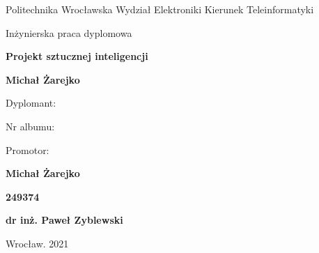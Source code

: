 \documentclass[12pt,oneside,a4paper]{report}
\begin{document}
\begin{titlepage}
   \begin{center}
        \vspace*{2cm}

        \large Politechnika Wrocławska Wydział Elektroniki Kierunek Teleinformatyki
        \vspace*{2cm}

        \large Inżynierska praca dyplomowa

        \vspace*{0.5cm}
        \huge\textbf{Projekt sztucznej inteligencji}

        \vspace{0.5cm}
        \normalsize 
            
        \textbf{Michał Żarejko}
        \vspace{3cm}

   \end{center}

        \setlength{\columnsep}{-20pt}
        \begin{multicols}{2}
           Dyplomant:  

           \vspace{0.2cm}
           Nr albumu:

           \vspace{0.2cm}
           Promotor:

        \columnbreak
           \textbf{Michał Żarejko}

           \vspace{0.2cm}
            \textbf{249374}

           \vspace{0.2cm}
            \textbf{dr inż. Paweł Zyblewski}
        \end{multicols}

        \vspace{0.5cm}


        \vspace{2cm}
   \begin{center}
        Wrocław. 2021


   \end{center}
\end{titlepage}


\tableofcontents{}
\newpage

\setlength{\parindent}{0.5em}
\setlength{\parskip}{0.5em}
\renewcommand{\baselinestretch}{1.5}
\end{document}
